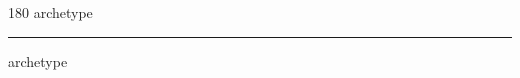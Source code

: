 
\begin{frame}
\begin{center}
\begin{turn}{180}
{\fontsize{2.5cm}{1em}\selectfont archetype}
\end{turn}
\vspace{1em}\par  
\hrule
\vspace{1em}\par  
{\fontsize{2.5cm}{1em}\selectfont archetype}
\end{center}
\end{frame}
